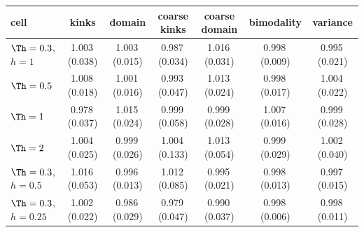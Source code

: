 \begin{tabular}{@{}l c c c c c c@{}}
\toprule
cell & kinks & domain & coarse kinks & coarse domain & bimodality & variance \\
\midrule
$\Th=0.3$, $h=1$ & 1.003\,(0.038) & 1.003\,(0.015) & 0.987\,(0.034) & 1.016\,(0.031) & 0.998\,(0.009) & 0.995\,(0.021) \\
$\Th=0.5$ & 1.008\,(0.018) & 1.001\,(0.016) & 0.993\,(0.047) & 1.013\,(0.024) & 0.998\,(0.017) & 1.004\,(0.022) \\
$\Th=1$ & 0.978\,(0.037) & 1.015\,(0.024) & 0.999\,(0.058) & 0.999\,(0.028) & 1.007\,(0.016) & 0.999\,(0.028) \\
$\Th=2$ & 1.004\,(0.025) & 0.999\,(0.026) & 1.004\,(0.133) & 1.013\,(0.054) & 0.999\,(0.029) & 1.002\,(0.040) \\
$\Th=0.3$, $h=0.5$ & 1.016\,(0.053) & 0.996\,(0.013) & 1.012\,(0.085) & 0.995\,(0.021) & 0.998\,(0.013) & 0.997\,(0.015) \\
$\Th=0.3$, $h=0.25$ & 1.002\,(0.022) & 0.986\,(0.029) & 0.979\,(0.047) & 0.990\,(0.037) & 0.998\,(0.006) & 0.998\,(0.011) \\
\bottomrule
\end{tabular}
